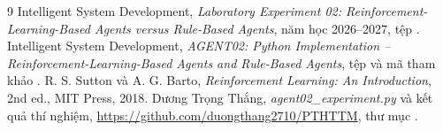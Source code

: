 \documentclass[12pt,a4paper]{report}
\begin{document}
\clearpage
\begin{thebibliography}{9}
 Intelligent System Development, \emph{Laboratory Experiment 02:
Reinforcement-Learning-Based Agents versus Rule-Based Agents}, năm học 2026--2027,
tệp .
 Intelligent System Development, \emph{AGENT02: Python
Implementation -- Reinforcement-Learning-Based Agents and Rule-Based Agents},
tệp  và mã tham khảo
.
 R. S. Sutton và A. G. Barto, \emph{Reinforcement Learning: An
Introduction}, 2nd ed., MIT Press, 2018.
 Dương Trọng Thắng, \emph{agent02\_experiment.py} và kết quả thí nghiệm,
\url{https://github.com/duongthang2710/PTHTTM}, thư mục .
\end{thebibliography}
\end{document}
